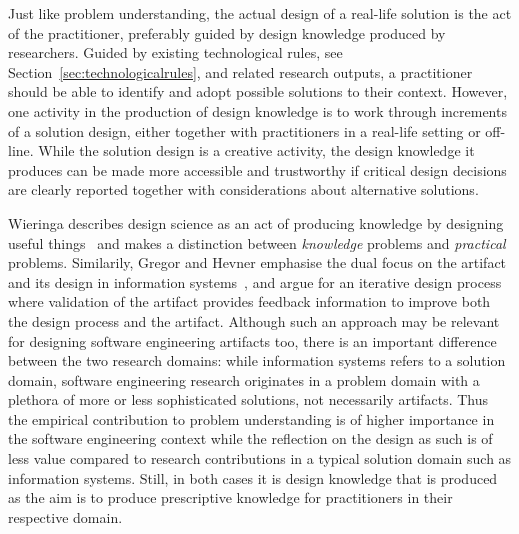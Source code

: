 \documentclass[graybox]{svmult}
\begin{document}
Just like problem understanding, the actual design of a real-life solution is the act of the practitioner, preferably guided by design knowledge produced by researchers. %
Guided by existing technological rules, see Section~\ref{sec:technologicalrules}, and related research outputs, a practitioner should be able to identify and adopt possible solutions to their context. However, one activity in the production of design knowledge is to work through increments of a solution design, either together with practitioners in a real-life setting or off-line. %
While the solution design is a creative activity, the design knowledge it produces can be made more accessible and trustworthy if critical design decisions are clearly reported together with considerations about alternative solutions.





Wieringa describes design science as an act of producing knowledge by designing useful things~\cite{wieringa_design_2009} and makes a distinction between \emph{knowledge} problems and \emph{practical} problems. Similarily, Gregor and Hevner emphasise the dual focus on the artifact and its design in information systems~\cite{gregor_positioning_2013}, and argue for an iterative design process where validation of the artifact provides feedback information to improve both the design process and the artifact. Although such an approach may be relevant for designing software engineering artifacts too, there is an important difference between the two research domains: while information systems refers to a solution domain, software engineering research originates in a problem domain with a plethora of more or less sophisticated solutions, not necessarily artifacts. Thus the empirical contribution to problem understanding is of higher importance in the software engineering context while the reflection on the design as such is of less value compared to research contributions in a typical solution domain such as information systems. Still, in both cases it is design knowledge that is produced as the aim is to produce prescriptive knowledge for practitioners in their respective domain. 

 
\end{document}
